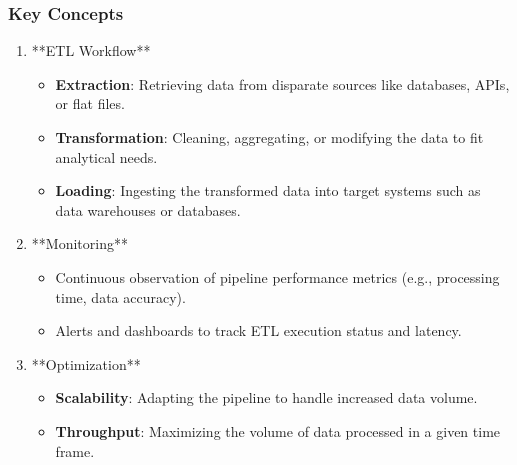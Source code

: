 \documentclass[aspectratio=169]{beamer}
\begin{document}
\begin{frame}[fragile]
    \frametitle{Key Concepts}
    \begin{enumerate}
        \item **ETL Workflow**
        \begin{itemize}
            \item \textbf{Extraction}: Retrieving data from disparate sources 
            like databases, APIs, or flat files.
            \item \textbf{Transformation}: Cleaning, aggregating, or modifying 
            the data to fit analytical needs.
            \item \textbf{Loading}: Ingesting the transformed data into target 
            systems such as data warehouses or databases.
        \end{itemize}
        
        \item **Monitoring**
        \begin{itemize}
            \item Continuous observation of pipeline performance metrics 
            (e.g., processing time, data accuracy).
            \item Alerts and dashboards to track ETL execution status and 
            latency.
        \end{itemize}

        \item **Optimization**
        \begin{itemize}
            \item \textbf{Scalability}: Adapting the pipeline to handle 
            increased data volume.
            \item \textbf{Throughput}: Maximizing the volume of data processed 
            in a given time frame.
        \end{itemize}
    \end{enumerate}
\end{frame}
\end{document}
